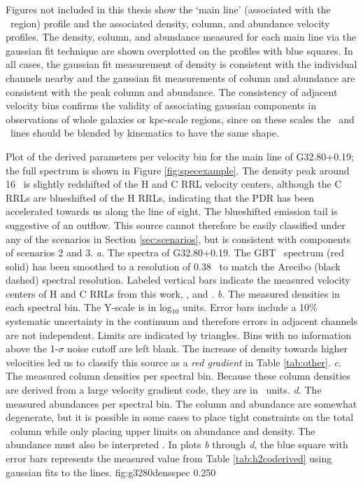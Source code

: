 Figures not included in this thesis show the `main %
line' (associated with the \uchii\ region) profile and the associated density,
column, and abundance velocity profiles.  The density, column, and abundance
measured for each main line via the gaussian fit technique are shown
overplotted on the profiles with blue squares.  In all cases, the gaussian fit
measurement of density is consistent with the individual channels nearby and
the gaussian fit measurements of column and abundance are consistent with the
peak column and abundance.  The consistency of adjacent velocity bins confirms
the validity of associating gaussian components in observations of whole
galaxies \citep[e.g., ][]{Mangum2008} or kpc-scale regions, since on these scales
the \oneone\ and \twotwo\ lines should be blended by kinematics to have the
same shape.

{ %
Plot of the derived parameters per velocity bin for the main line of
G32.80+0.19; the full spectrum is shown in Figure \ref{fig:specexample}.  The
density peak around 16 \kms\ is slightly redshifted of the H and C RRL velocity
centers, although the C RRLs are blueshifted of the H
RRLs, indicating that the PDR has been accelerated towards us along the line of
sight.  The blueshifted emission tail is suggestive of an outflow.  This source
cannot therefore be easily classified under any of the scenarios in Section
\ref{sec:scenarios}, but is consistent with components of scenarios 2 and 3. 
{\it a.} The spectra of G32.80+0.19.  The GBT \twotwo\ spectrum (red solid) has
been smoothed to a resolution of 0.38 \kms\ to match the Arecibo (black dashed)
spectral resolution.   Labeled vertical bars indicate the measured velocity centers
of H and C RRLs from this work, \citet{Roshi2005}, and \citet{Churchwell2010}. 
{\it b.} The measured densities in each spectral bin.  The Y-scale is in log$_{10}$
units. Error bars include a 10\% systematic uncertainty in the continuum and
therefore errors in adjacent channels are not independent.  Limits are
indicated by triangles.  Bins with no information above the 1-$\sigma$ noise
cutoff are left blank.  The increase of density towards higher velocities led us
to classify this source as a {\it red gradient} in Table \ref{tab:other}. 
{\it c.} The measured column densities per spectral bin.  Because these column
densities are derived from a large velocity gradient code, they are in
\perkmspc\ units.
{\it d.} The measured abundances per spectral bin.  The column and abundance are 
somewhat degenerate, but it is possible in some cases to place tight constraints
on the total \ortho\ column while only placing upper limits on abundance
and density.  The abundance must also be interpreted \perkmspc. 
In plots {\it b} through {\it d}, the blue square with error bars
represents the measured value from Table \ref{tab:h2coderived} using gaussian
fits to the lines.
}
{fig:g3280densspec}
{0.25}{0}

